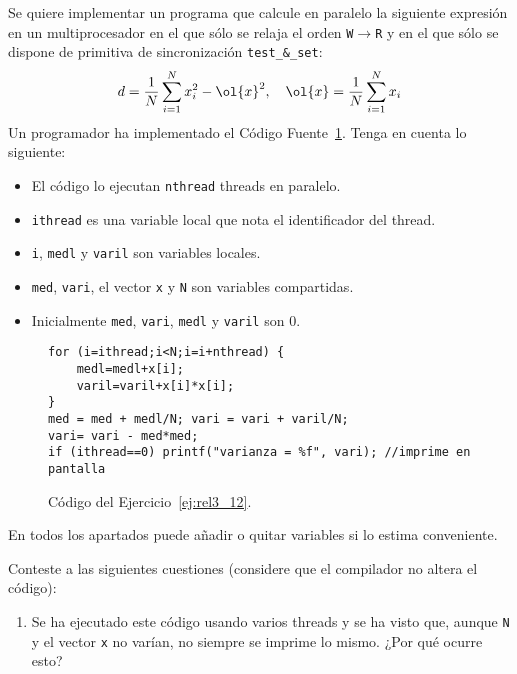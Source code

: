 \begin{ejercicio} \label{ej:rel3_12}
    Se quiere implementar un programa que calcule en paralelo la siguiente expresión en un
    multiprocesador en el que sólo se relaja el orden \verb|W|$\to$\verb|R| y en el que sólo se dispone de primitiva de
    sincronización \verb|test_&_set|:
    \[
        d = \frac{1}{N} \sum_{i=1}^{N} x_i^2 - \ol{x}^2, \quad \ol{x} = \frac{1}{N} \sum_{i=1}^{N} x_i
    \]
    Un programador ha implementado el Código Fuente~\ref{cod:ej_rel3_12}. Tenga en cuenta lo siguiente:
    \begin{itemize}
        \item El código lo ejecutan \verb|nthread| threads en paralelo.
        \item \verb|ithread| es una variable local que nota el identificador del thread.
        \item \verb|i|, \verb|medl| y \verb|varil| son variables locales.
        \item \verb|med|, \verb|vari|, el vector \verb|x| y \verb|N| son variables compartidas.
        \item Inicialmente \verb|med|, \verb|vari|, \verb|medl| y \verb|varil| son 0.
    \end{itemize}
    \begin{figure}[H]
        \centering
        \begin{verbatim}
for (i=ithread;i<N;i=i+nthread) {
    medl=medl+x[i];
    varil=varil+x[i]*x[i];
}
med = med + medl/N; vari = vari + varil/N;
vari= vari - med*med;
if (ithread==0) printf("varianza = %f", vari); //imprime en pantalla
        \end{verbatim}
        \caption{Código del Ejercicio~\ref{ej:rel3_12}.}
        \label{cod:ej_rel3_12}
    \end{figure}
    
    \begin{observacion}
        En todos los apartados puede añadir o quitar variables si lo estima conveniente.
    \end{observacion}
    Conteste a las siguientes cuestiones (considere que el compilador no altera el código):
    \begin{enumerate}
        \item Se ha ejecutado este código usando varios threads y se ha visto que, aunque \verb|N| y el vector \verb|x| no
        varían, no siempre se imprime lo mismo. ¿Por qué ocurre esto?


\end{enumerate}
\end{ejercicio}
